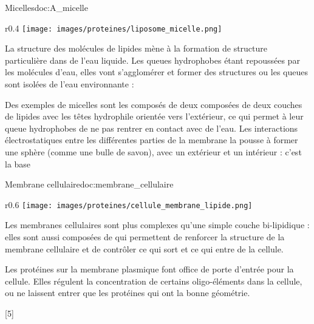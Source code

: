 \newpage
\begin{doc}{Micelles}{doc:A_micelle}
  \begin{wrapfigure}{r}{0.4\linewidth}
    \centering
    \vspace*{-36pt}
    \texttt{[image: images/proteines/liposome\_micelle.png]}
  \end{wrapfigure}

  La structure des molécules de lipides mène à la formation de structure particulière dans de l'eau liquide.
  Les queues hydrophobes étant repoussées par les molécules d'eau, elles vont s'agglomérer et former des structures ou les queues sont isolées de l'eau environnante : 

  Des exemples de micelles sont les  composés de deux  composées de deux couches de lipides avec les têtes hydrophile orientée vers l'extérieur, ce qui permet à leur queue hydrophobes de ne pas rentrer en contact avec de l'eau. 
  Les interactions électrostatiques entre les différentes parties de la membrane la pousse à former une sphère (comme une bulle de savon), avec un extérieur et un intérieur : c'est la base 
\end{doc}

\begin{doc}{Membrane cellulaire}{doc:membrane_cellulaire}
  \begin{wrapfigure}{r}{0.6\linewidth}
    \centering
    \vspace*{-36pt}
    \texttt{[image: images/proteines/cellule\_membrane\_lipide.png]}
  \end{wrapfigure}
  Les membranes cellulaires sont plus complexes qu'une simple couche bi-lipidique : elles sont aussi composées de  qui permettent de renforcer la structure de la membrane cellulaire et de contrôler ce qui sort et ce qui entre de la cellule.
  \bigskip

  Les protéines sur la membrane plasmique font office de porte d'entrée pour la cellule. 
  Elles régulent la concentration de certains oligo-éléments dans la cellule, ou ne laissent entrer que les protéines qui ont la bonne géométrie.

  \vspace{2.2cm}
  \phantom{b}

\end{doc}

[5]
